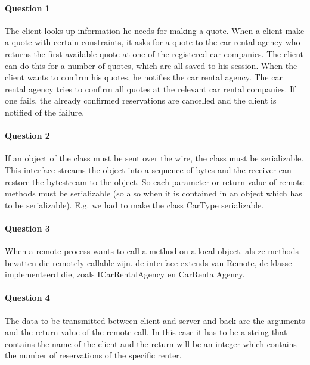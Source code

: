 \documentclass{ds-report}
\begin{document}
	\maketitle

	\paragraph{Question 1} 
	The client looks up information he needs for making a quote. When a client make a quote with certain constraints, it asks for a quote to the car rental agency who returns the first available quote at one of the registered car companies. 
	The client can do this for a number of quotes, which are all saved to his session. When the client wants to confirm his quotes, he notifies the car rental agency. The car rental agency tries to confirm all quotes at the relevant car rental companies. If one fails, the already confirmed reservations are cancelled and the client is notified of the failure.
	
	
	\paragraph{Question 2}
	If an object of the class must be sent over the wire, the class must be serializable. This interface streams the object into a sequence of bytes and the receiver can restore the bytestream to the object. So each parameter or return value of remote methods must be serializable  (so also when it is contained in an object which has to be serializable). E.g. we had to make the class CarType serializable. 
	
	
	\paragraph{Question 3} 
	When a remote process wants to call a method on a local object. 
	als ze methods bevatten die remotely callable zijn. de interface extends van Remote, de klasse implementeerd die, zoals ICarRentalAgency en CarRentalAgency.
	
	\paragraph{Question 4}
	The data to be transmitted between client and server and back are the arguments and the return value of the remote call. In this case it has to be a string that contains the name of the client and the return will be an integer which contains the number of reservations of the specific renter.
	
\end{document}
